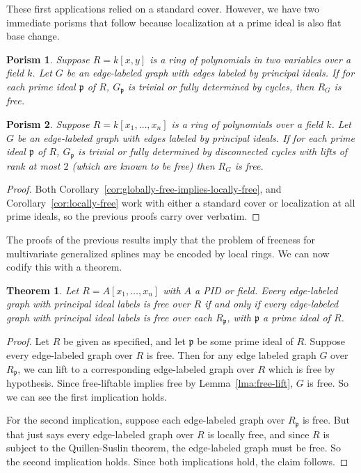 \documentclass{article}
\newtheorem{theorem}{Theorem}
\newtheorem{porism}{Porism}
\begin{document}
These first applications relied on a standard cover. However, we have two immediate porisms that follow because localization at a prime ideal is also flat base change.


\begin{porism}
Suppose $R = k[x,y]$ is a ring of polynomials in two variables over a field $k$. Let $G$ be an edge-labeled graph with edges labeled by principal ideals. If for each prime ideal $\mathfrak p$ of $R$, $G_{\mathfrak p}$ is trivial or fully determined by cycles, then $R_G$ is free.
\end{porism}
\begin{porism}
Suppose $R = k[x_1, \dots, x_n]$ is a ring of polynomials over a field $k$. Let $G$ be an edge-labeled graph with edges labeled by principal ideals. If for each prime ideal $\mathfrak p$ of $R$, $G_{\mathfrak p}$ is trivial or fully determined by disconnected cycles with lifts of rank at most $2$ (which are known to be free) then $R_G$ is free.
\end{porism}
\begin{proof}
Both Corollary~\ref{cor:globally-free-implies-locally-free}, and Corollary~\ref{cor:locally-free} work with either a standard cover or localization at all prime ideals, so the previous proofs carry over verbatim.
\end{proof}

The proofs of the previous results imply that the problem of freeness for multivariate generalized splines may be encoded by local rings. We can now codify this with a theorem.

\begin{theorem}
Let $R= A[x_1,\dots,x_n]$ with $A$ a PID or field. Every edge-labeled graph with principal ideal labels is free over $R$ if and only if every edge-labeled graph with principal ideal labels is free over each $R_{\mathfrak p}$, with $\mathfrak p$ a prime ideal of $R$.
\end{theorem}
\begin{proof}
Let $R$ be given as specified, and let $\mathfrak p$ be some prime ideal of $R$. Suppose every edge-labeled graph over $R$ is free. Then for any edge labeled graph $G$ over $R_{\mathfrak p}$, we can lift to a corresponding edge-labeled graph over $R$ which is free by hypothesis. Since free-liftable implies free by Lemma~\ref{lma:free-lift}, $G$ is free. So we can see the first implication holds.

For the second implication, suppose each edge-labeled graph over $R_{\mathfrak p}$ is free. But that just says every edge-labeled graph over $R$ is locally free, and since $R$ is subject to the Quillen-Suslin theorem, the edge-labeled graph must be free. So the second implication holds. Since both implications hold, the claim follows.
\end{proof}
\end{document}
